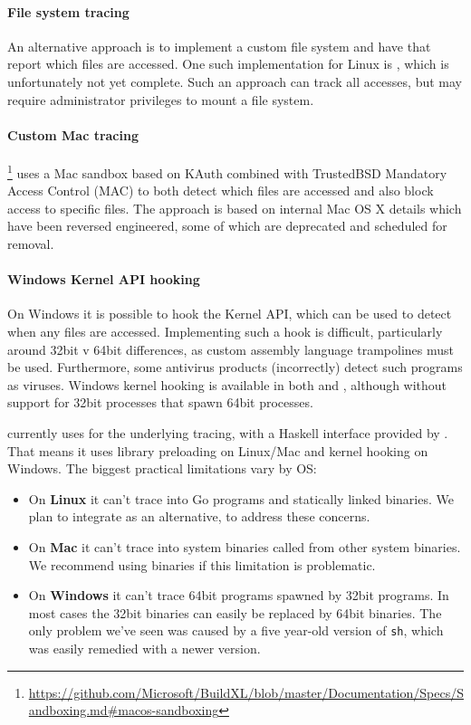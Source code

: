 \paragraph{File system tracing} An alternative approach is to implement a custom file system and have that report which files are accessed. One such implementation for Linux is \tracedfs \cite{tracedfs}, which is unfortunately not yet complete. Such an approach can track all accesses, but may require administrator privileges to mount a file system.

\paragraph{Custom Mac tracing} \BuildXL \cite{buildxl}\footnote{\url{https://github.com/Microsoft/BuildXL/blob/master/Documentation/Specs/Sandboxing.md\#macos-sandboxing}} uses a Mac sandbox based on KAuth combined with TrustedBSD Mandatory Access Control (MAC) to both detect which files are accessed and also block access to specific files. The approach is based on internal Mac OS X details which have been reversed engineered, some of which are deprecated and scheduled for removal.

\paragraph{Windows Kernel API hooking} On Windows it is possible to hook the Kernel API, which can be used to detect when any files are accessed. Implementing such a hook is difficult, particularly around 32bit v 64bit differences, as custom assembly language trampolines must be used. Furthermore, some antivirus products (incorrectly) detect such programs as viruses. Windows kernel hooking is available in both \Fsatrace and \Bigbro, although without support for 32bit processes that spawn 64bit processes.

\postparagraphs

\Rattle currently uses \Fsatrace for the underlying tracing, with a Haskell interface provided by \Shake. That means it uses library preloading on Linux/Mac and kernel hooking on Windows. The biggest practical limitations vary by OS:

\begin{itemize}
\item On \textbf{Linux} it can't trace into Go programs and statically linked binaries. We plan to integrate \Bigbro as an alternative, to address these concerns.
\item On \textbf{Mac} it can't trace into system binaries called from other system binaries. We recommend using \Nix binaries if this limitation is problematic.
\item On \textbf{Windows} it can't trace 64bit programs spawned by 32bit programs. In most cases the 32bit binaries can easily be replaced by 64bit binaries. The only problem we've seen was caused by a five year-old version of \texttt{sh}, which was easily remedied with a newer version.
\end{itemize}

